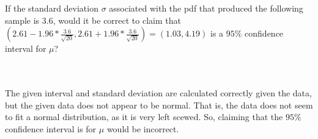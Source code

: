 If the standard deviation $\sigma$ associated with the pdf that produced the following sample is 3.6,
would it be correct to claim that
$(2.61-1.96*\frac{3.6}{\sqrt{20}},2.61+1.96*\frac{3.6}{\sqrt{20}})=(1.03, 4.19)$ is a $95\%$ confidence
interval for $\mu$?\\\\

\begin{solution}\renewcommand{\qedsymbol}{}\ \\
    The given interval and standard deviation are calculated correctly given the data, but the given
    data does not appear to be normal. That is, the data does not seem to fit a normal distribution, as
    it is very left scewed. So, claiming that the $95\%$ confidence interval is for $\mu$ would be
    incorrect.

\end{solution}
